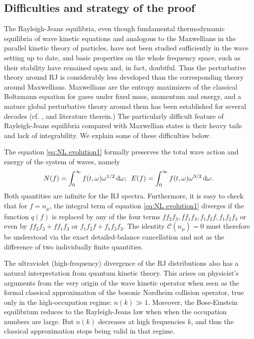 \documentclass[reqno,11pt,letterpaper]{amsart}
\numberwithin{equation}{section}
\newcommand{\dd}{\, {\rm d}}
\begin{document}
\subsection{Difficulties and strategy of the proof}

The Rayleigh-Jeans equilibria, even though fundamental thermodynamic equilibria of wave kinetic equations and analogous to the Maxwellians in
the parallel kinetic theory of particles, have not been studied
sufficiently in the wave setting up to date, and basic properties on the whole frequency space, such as
their stability have remained open and, in fact, doubtful. Thus the perturbative theory around RJ is considerably less developed than the corresponding theory around Maxwellians. Maxwellians
are the entropy maximizers of the classical Boltzmann equation for gases under fixed mass, momentum and energy, and a mature global perturbative theory
around them has been established for several decades (cf. \cite{cercignani1988}, \cite{Villani_review} and literature therein.) 
The particularly difficult feature of Rayleigh-Jeans equilibria compared with Maxwellian states is their heavy tails and lack of integrability. We explain some of these difficulties below.

The equation \eqref{eq:NL evolution1} formally preserves the total wave action and energy of the system of waves, namely
$$
N(f)=\int _0^\infty f(t, \omega )  \omega^{1/2} \dd\omega;\,\,\, 
E(f)=\int _0^\infty f(t, \omega ) \omega^{3/2} \dd\omega.
$$ 
Both quantities are infinite for the RJ spectra. Furthermore, it is easy to check that for $f=n_\mu$, the integral term of  equation \eqref{eq:NL evolution1} diverges if the function $q(f)$ is replaced by any of the four terms $f f_2 f_3, f f_1 f_3,  f_1 f_2 f ,  f_1 f_2 f_3 $ or even by $ f f_2 f_3 + f f_1 f_3 $ or $ f_1 f_2 f + f_1 f_2 f_3$. The identity
$\mathcal{C}(n_\mu)=0$ must therefore be understood via the exact detailed-balance cancellation and not as the difference of two individually finite quantities. 

 
The ultraviolet (high-frequency) divergence of the RJ distributions also has
a natural interpretation from quantum kinetic theory. This arises on physicist's arguments from the very origin of the wave kinetic operator when seen as the formal classical approximation of the bosonic Nordheim collision operator, true only in the high-occupation regime: $n(k)\gg 1$. Moreover, the Bose-Einstein equilibrium reduces to the Rayleigh-Jeans law when when the occupation numbers are large. But $n(k)$ decreases at high frequencies $k$, and thus the classical approximation stops being valid in that regime.
\end{document}
